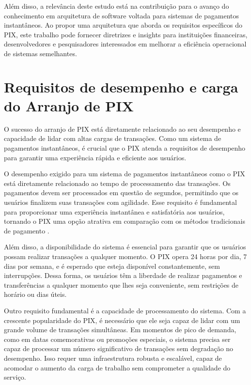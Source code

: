 \documentclass[12pt]{article}
\begin{document}
Além disso, a relevância deste estudo está na contribuição para o avanço do conhecimento em arquitetura de software voltada para sistemas de pagamentos instantâneos. Ao propor uma arquitetura que aborda os requisitos específicos do PIX, este trabalho pode fornecer diretrizes e insights para instituições financeiras, desenvolvedores e pesquisadores interessados em melhorar a eficiência operacional de sistemas semelhantes.

\section{Requisitos de desempenho e carga do Arranjo de PIX} \label{sec:firstpage}

O sucesso do arranjo de PIX está diretamente relacionado ao seu desempenho e capacidade de lidar com altas cargas de transações. Como um sistema de pagamentos instantâneos, é crucial que o PIX atenda a requisitos de desempenho para garantir uma experiência rápida e eficiente aos usuários.

O desempenho exigido para um sistema de pagamentos instantâneos como o PIX está diretamente relacionado ao tempo de processamento das transações. Os pagamentos devem ser processados em questão de segundos, permitindo que os usuários finalizem suas transações com agilidade. Esse requisito é fundamental para proporcionar uma experiência instantânea e satisfatória aos usuários, tornando o PIX uma opção atrativa em comparação com os métodos tradicionais de pagamento .

Além disso, a disponibilidade do sistema é essencial para garantir que os usuários possam realizar transações a qualquer momento. O PIX opera 24 horas por dia, 7 dias por semana, e é esperado que esteja disponível constantemente, sem interrupções. Dessa forma, os usuários têm a liberdade de realizar pagamentos e transferências a qualquer momento que lhes seja conveniente, sem restrições de horário ou dias úteis.

Outro requisito fundamental é a capacidade de processamento do sistema. Com a crescente popularidade do PIX, é necessário que ele seja capaz de lidar com um grande volume de transações simultâneas. Em momentos de pico de demanda, como em datas comemorativas ou promoções especiais, o sistema precisa ser capaz de processar um número significativo de transações sem degradação no desempenho. Isso requer uma infraestrutura robusta e escalável, capaz de acomodar o aumento da carga de trabalho sem comprometer a qualidade do serviço.
\end{document}
